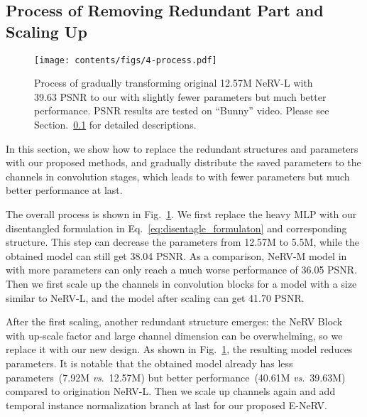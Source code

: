 \documentclass[runningheads]{llncs}
\begin{document}
\subsection{Process of Removing Redundant Part and Scaling Up}
\label{exp-process}

\begin{figure}[t]
    \centering
    \texttt{[image: contents/figs/4-process.pdf]}
    \caption{Process of gradually transforming original 12.57M NeRV-L with 39.63 PSNR to our \netname with slightly fewer parameters but much better performance. PSNR results are tested on ``Bunny'' video. Please see Section.~\ref{exp-process} for detailed descriptions.}
    \label{fig:exp-parameters-process}
    
\end{figure}

In this section, we show how to replace the redundant structures and parameters with our proposed methods, and gradually distribute the saved parameters to the channels in convolution stages, which leads to \netname with fewer parameters but much better performance at last.

The overall process is shown in Fig.~\ref{fig:exp-parameters-process}. We first replace the heavy MLP with our disentangled formulation in Eq.~\ref{eq:disentagle_formulaton} and corresponding structure. This step can decrease the parameters from 12.57M to 5.5M, while the obtained model can still get 38.04 PSNR. As a comparison, NeRV-M model in \cite{chen2021nerv} with more parameters can only reach a much worse performance of 36.05 PSNR. Then we first scale up the channels in convolution blocks for a model with a size similar to NeRV-L, and the model after scaling can get 41.70 PSNR.

After the first scaling, another redundant structure emerges: the NeRV Block with up-scale factor  and large channel dimension can be overwhelming, so we replace it with our new design. As shown in Fig.~\ref{fig:exp-parameters-process}, the resulting model reduces  parameters. It is notable that the obtained model already has less parameters~(7.92M \emph{vs}.\ 12.57M) but better performance~(40.61M \emph{vs}.\ 39.63M) compared to origination NeRV-L. Then we scale up channels again and add temporal instance normalization branch at last for our proposed E-NeRV.
\end{document}
